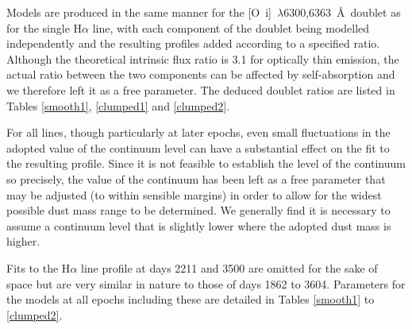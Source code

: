 \documentclass[useAMS,usenatbib,usegraphicx]{mnras}
\begin{document}
Models are produced in the same manner for the 
[O~{\sc i}]~$\lambda$6300,6363~\AA\ doublet as for the single H$\alpha$ line, with each component 
of the doublet being modelled independently and the resulting profiles 
added according to a specified ratio.  Although the theoretical intrinsic flux ratio 
is 3.1 for optically thin emission, the actual ratio between the two components can be 
affected by self-absorption \citep{Li1992} and we therefore 
left it as a free parameter.  The deduced doublet ratios are listed in Tables \ref{smooth1}, \ref{clumped1} and \ref{clumped2}.  

For all lines, though particularly at later epochs, even small fluctuations in the adopted value of the 
continuum level can have a substantial effect on the fit to the resulting 
profile.  Since it is not feasible to establish the level of the continuum 
so precisely, the value of the continuum has been left as a free parameter 
that may be adjusted (to within sensible margins) in order to allow for 
the widest possible dust mass range to be determined.  We generally find 
it is necessary to assume a continuum level that is slightly lower where 
the adopted dust mass is higher.  

Fits to the H$\alpha$ line profile at days 2211 and 3500 are omitted for the sake of space but are very similar in nature to those of days 1862 to 3604.  Parameters for the models at all epochs including these are detailed in Tables \ref{smooth1} to \ref{clumped2}.
\end{document}
